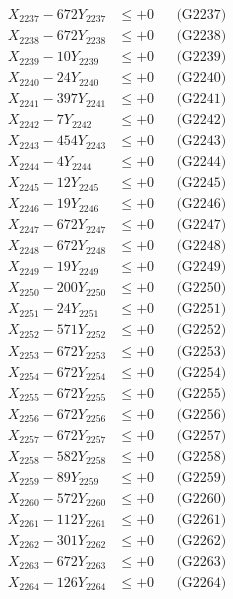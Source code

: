 \documentclass[a4paper,10pt]{article}
\begin{document}
{\begin{align}
X_{2237} - 672Y_{2237} &\leq +0 && \text{(G2237)} \\
X_{2238} - 672Y_{2238} &\leq +0 && \text{(G2238)} \\
X_{2239} - 10Y_{2239} &\leq +0 && \text{(G2239)} \\
X_{2240} - 24Y_{2240} &\leq +0 && \text{(G2240)} \\
\allowbreak
X_{2241} - 397Y_{2241} &\leq +0 && \text{(G2241)} \\
X_{2242} - 7Y_{2242} &\leq +0 && \text{(G2242)} \\
X_{2243} - 454Y_{2243} &\leq +0 && \text{(G2243)} \\
X_{2244} - 4Y_{2244} &\leq +0 && \text{(G2244)} \\
X_{2245} - 12Y_{2245} &\leq +0 && \text{(G2245)} \\
X_{2246} - 19Y_{2246} &\leq +0 && \text{(G2246)} \\
X_{2247} - 672Y_{2247} &\leq +0 && \text{(G2247)} \\
X_{2248} - 672Y_{2248} &\leq +0 && \text{(G2248)} \\
X_{2249} - 19Y_{2249} &\leq +0 && \text{(G2249)} \\
X_{2250} - 200Y_{2250} &\leq +0 && \text{(G2250)} \\
\allowbreak
X_{2251} - 24Y_{2251} &\leq +0 && \text{(G2251)} \\
X_{2252} - 571Y_{2252} &\leq +0 && \text{(G2252)} \\
X_{2253} - 672Y_{2253} &\leq +0 && \text{(G2253)} \\
X_{2254} - 672Y_{2254} &\leq +0 && \text{(G2254)} \\
X_{2255} - 672Y_{2255} &\leq +0 && \text{(G2255)} \\
X_{2256} - 672Y_{2256} &\leq +0 && \text{(G2256)} \\
X_{2257} - 672Y_{2257} &\leq +0 && \text{(G2257)} \\
X_{2258} - 582Y_{2258} &\leq +0 && \text{(G2258)} \\
X_{2259} - 89Y_{2259} &\leq +0 && \text{(G2259)} \\
X_{2260} - 572Y_{2260} &\leq +0 && \text{(G2260)} \\
\allowbreak
X_{2261} - 112Y_{2261} &\leq +0 && \text{(G2261)} \\
X_{2262} - 301Y_{2262} &\leq +0 && \text{(G2262)} \\
X_{2263} - 672Y_{2263} &\leq +0 && \text{(G2263)} \\
X_{2264} - 126Y_{2264} &\leq +0 && \text{(G2264)} \\

\end{align}}
\end{document}
